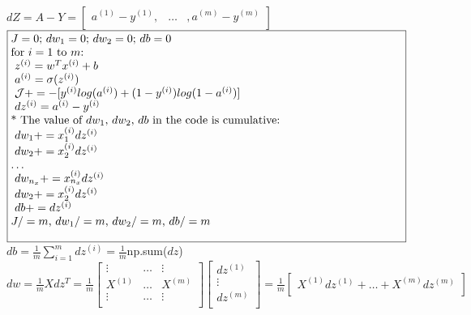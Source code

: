 \documentclass{article}
\begin{document}
$dZ = A-Y =
\begin{bmatrix}
a^{(1)} - y^{(1)}, & \dots & , a^{(m)}-y^{(m)} \\
\end{bmatrix} $\\

$\noindent\fbox{%
\parbox{\textwidth}{%
$J=0$; $dw_1 = 0$; $dw_2 = 0$; $db=0$\\

for $i=1$ to $m$:\\
$\indent$ $z^{(i)} = w^T x^{(i)} + b$\\
$\indent$ $a^{(i)} = \sigma(z^{(i)})$\\
$\indent$ $\mathcal{J} += -[y^{(i)} log(a^{(i)}) + (1-y^{(i)})log(1-a^{(i)})]$\\
$\indent$ $dz^{(i)} = a^{(i)}- y^{(i)}$\\

* The value of $dw_1$, $dw_2$, $db$ in the code is cumulative:\\
$\indent$ $dw_1 += x_1^{(i)}dz^{(i)}$\\
$\indent$ $dw_2 += x_2^{(i)}dz^{(i)}$\\
$\dots$\\
$\indent$ $dw_{n_x} += x_{n_x}^{(i)}dz^{(i)}$\\

$\indent$ $dw_2 += x_2^{(i)}dz^{(i)}$\\
$\indent$ $db += dz^{(i)}$\\

$J/=m$,  $dw_1 /=m$,  $dw_2 /=m$,  $db /=m$\\
    }%
}$\\


$db = \frac{1}{m}\sum_{i=1}^{m}dz^{(i)} = \frac{1}{m}$np.sum($dz$)\\

$dw = \frac{1}{m} X dz^{T} = \frac{1}{m} \begin{bmatrix}
\vdots & \dots & \vdots \\
X^{(1)} & \dots & X^{(m)}\\
\vdots & \dots & \vdots \\
\end{bmatrix}
\begin{bmatrix}
dz^{(1)} \\
\vdots \\
dz^{(m)} \\
\end{bmatrix}
= \frac{1}{m} \begin{bmatrix}
X^{(1)}dz^{(1)} + \dots + X^{(m)}dz^{(m)}\\
\end{bmatrix}
$\\
\end{document}
